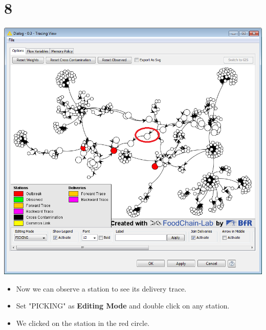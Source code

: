 \documentclass{beamer}
\begin{document}
\section{8}
\begin{frame}
	\begin{center}
  		\includegraphics[height=0.6\textheight]{8.png}
	\end{center}
	\begin{itemize}
		\item Now we can observe a station to see its delivery trace.
		\item Set "PICKING" as \textbf{Editing Mode} and double click on any station.
		\item We clicked on the station in the red circle.
	\end{itemize}
\end{frame}
\end{document}
